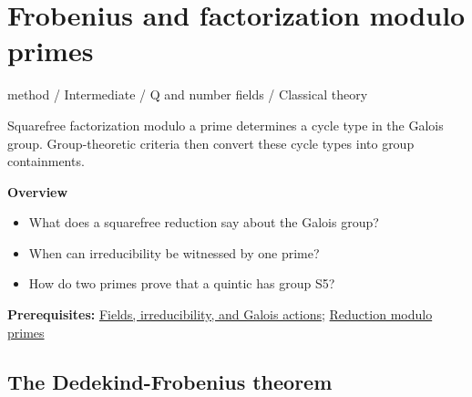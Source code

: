 \documentclass[11pt,a4paper,oneside,openany]{book}
\begin{document}
\chapter{Frobenius and factorization modulo primes}\label{article:frobenius}\hypertarget{article:frobenius}{}\color{black}
{\sffamily\small\color{atlasgold}method / Intermediate / Q and number fields / Classical theory}\par\medskip
Squarefree factorization modulo a prime determines a cycle type in the Galois group. Group-theoretic criteria then convert these cycle types into group containments.\par\medskip
\textbf{Overview}\begin{itemize}
\item What does a squarefree reduction say about the Galois group?
\item When can irreducibility be witnessed by one prime?
\item How do two primes prove that a quintic has group S5?
\end{itemize}
{\small\textbf{Prerequisites:} \hyperlink{article:foundations}{Fields, irreducibility, and Galois actions}; \hyperlink{article:modular-irreducibility}{Reduction modulo primes}}\par
{}\section{The Dedekind-Frobenius theorem}
\end{document}

